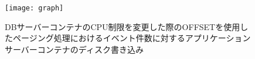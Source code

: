 \documentclass[../../../../../main]{subfiles}
\begin{document}
    \begin{figure}[H]
        \centering
        \texttt{[image: graph]}
        \caption{DBサーバーコンテナのCPU制限を変更した際のOFFSETを使用したページング処理におけるイベント件数に対するアプリケーションサーバーコンテナのディスク書き込み}
        \label{fig:paging-offset-change-db-cpu-limit-app-disk-in-app_4_8192-db_1024}
    \end{figure}
\end{document}
